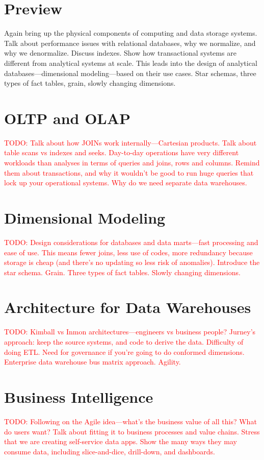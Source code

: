 \documentclass[11pt]{book}
\newcommand{\todo}[1]{\textcolor{red}{TODO: #1}} %
\begin{document}
\section*{Preview}

Again bring up the physical components of computing and data storage systems.  Talk about performance issues with relational databases, why we normalize, and why we denormalize.  Discuss indexes.  Show how transactional systems are different from analytical systems at scale.  This leads into the design of analytical databases---dimensional modeling---based on their use cases.  Star schemas, three types of fact tables, grain, slowly changing dimensions.

\section{OLTP and OLAP}
\todo{Talk about how JOINs work internally---Cartesian products.  Talk about table scans vs indexes and seeks.  Day-to-day operations have very different workloads than analyses in terms of queries and joins, rows and columns.  Remind them about transactions, and why it wouldn't be good to run huge queries that lock up your operational systems.  Why do we need separate data warehouses.}

\section{Dimensional Modeling}
\todo{Design considerations for databases and data marts---fast processing and ease of use.  This means fewer joins, less use of codes, more redundancy because storage is cheap (and there's no updating so less risk of anomalies).  Introduce the star schema.  Grain.  Three types of fact tables.  Slowly changing dimensions.}

\section{Architecture for Data Warehouses}
\todo{Kimball vs Inmon architectures---engineers vs business people?  Jurney's approach: keep the source systems, and code to derive the data.  Difficulty of doing ETL.  Need for governance if you're going to do conformed dimensions.  Enterprise data warehouse bus matrix approach. Agility.}

\section{Business Intelligence}
\todo{Following on the Agile idea---what's the business value of all this? What do users want?  Talk about fitting it to business processes and value chains.  Stress that we are creating self-service data apps.  Show the many ways they may consume data, including slice-and-dice, drill-down, and dashboards.}
\end{document}
